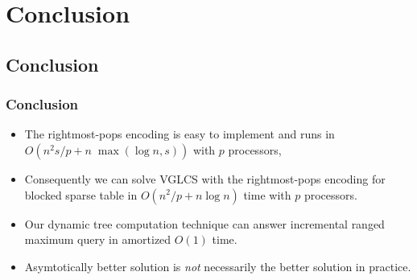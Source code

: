 \section{Conclusion}

\subsection{Conclusion}
\begin{frame}
  \frametitle{Conclusion}
  \begin{itemize}
    \item The rightmost-pops encoding is easy to implement and runs in
      $O(n^2 s/p+n\;\max(\log n, s))$ with $p$ processors,
    \item Consequently we can solve VGLCS with the rightmost-pops
      encoding for blocked sparse table in $O(n^2/p+n\log n)$ time
      with $p$ processors.
    \item Our dynamic tree computation technique can answer
      incremental ranged maximum query in amortized $O(1)$ time.
    \item Asymtotically better solution is {\em not} necessarily the
      better solution in practice.
  \end{itemize}
\end{frame}
